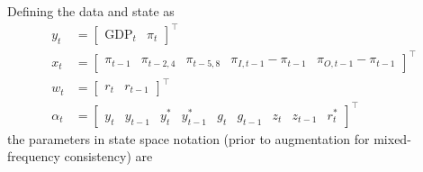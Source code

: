\documentclass{article}
\begin{document}
Defining the data and state as 
\begin{align*}
y_t &= \begin{bmatrix} \text{GDP}_t & \pi_t \end{bmatrix}^\top \\
x_t &= \begin{bmatrix} \pi_{t-1} & \pi_{t-2,4} & \pi_{t-5,8} & \pi_{I, t-1} - \pi_{t-1} & \pi_{O,t-1} - \pi_{t-1} \end{bmatrix}^\top \\
w_t &= \begin{bmatrix} r_t & r_{t-1} \end{bmatrix}^\top \\
\alpha_t &= \begin{bmatrix} y_t & y_{t-1} & y_t^* & y_{t-1}^* & g_t & g_{t-1} & z_t & z_{t-1} & r_t^*\end{bmatrix}^\top 
\end{align*}
the parameters in state space notation (prior to augmentation for mixed-frequency consistency) are
\end{document}
